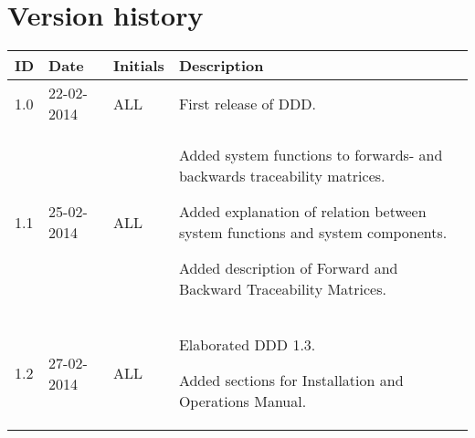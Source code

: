 \documentclass[Main]{subfiles}
\begin{document}
\section*{Version history}

\begin{tabular}{p{} p{} p{} p{}}
\hline
\textbf{ID} & \textbf{Date} & \textbf{Initials} & \textbf{Description}
\\
\hline
1.0 & 22-02-2014 & ALL & First release of DDD.
\\
1.1 & 25-02-2014 & ALL & Added  system functions to forwards- and backwards traceability matrices.

Added explanation of relation between system functions and system components.

Added description of Forward and Backward Traceability Matrices.
\\
1.2 & 27-02-2014 & ALL & Elaborated DDD 1.3.

Added sections for Installation and Operations Manual.\\\hline 
\end{tabular} 
\end{document}
